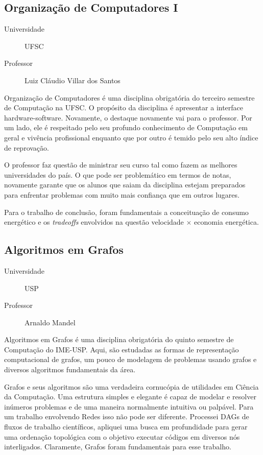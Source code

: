 \subsection{Organização de Computadores I}
\begin{description}
	\item[Universidade] UFSC
	\item[Professor] Luiz Cláudio Villar dos Santos
\end{description}

Organização de Computadores é uma disciplina obrigatória do terceiro semestre de
Computação na UFSC. O propósito da disciplina é apresentar a interface 
hardware-software. Novamente, o destaque novamente vai para o professor.
Por um lado, ele é respeitado pelo seu profundo conhecimento de Computação em
geral e vivência profissional enquanto que por outro é temido pelo seu alto
índice de reprovação.

O professor faz questão de ministrar seu curso tal como fazem as melhores
universidades do país. O que pode ser problemático em termos de notas, 
novamente garante que os alunos que saiam da disciplina estejam preparados para
enfrentar problemas com muito mais confiança que em outros lugares.

Para o trabalho de conclusão, foram fundamentais a conceituação de consumo
energético e os \emph{tradeoffs} envolvidos na questão velocidade $\times$ 
economia energética. 

\subsection{Algoritmos em Grafos}
\begin{description}
	\item[Universidade] USP
	\item[Professor] Arnaldo Mandel
\end{description}

Algoritmos em Grafos é uma disciplina obrigatória do quinto semestre de
Computação do IME-USP. Aqui, são estudadas as formas de representação
computacional de grafos, um pouco de modelagem de problemas usando grafos e 
diversos algoritmos fundamentais da área.

Grafos e seus algoritmos são uma verdadeira cornucópia de utilidades em Ciência
da Computação. Uma estrutura simples e elegante é capaz de modelar e resolver
inúmeros problemas e de uma maneira normalmente intuitiva ou palpável. Para
um trabalho envolvendo Redes isso não pode ser diferente. Processei DAGs de
fluxos de trabalho científicos, apliquei uma busca em profundidade para 
gerar uma ordenação topológica com o objetivo executar códigos em diversos nós 
interligados. Claramente, Grafos foram fundamentais para esse trabalho.

